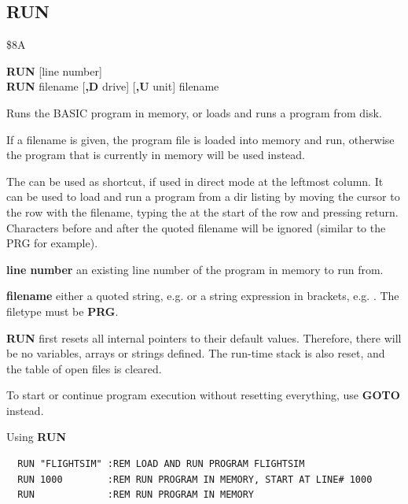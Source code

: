 
\newpage
\subsection{RUN}
\begin{description}[leftmargin=2cm,style=nextline]
\item [Token:] \$8A
\item [Format:] {\bf RUN} [line number] \\
                {\bf RUN} filename [{\bf,D} drive] [{\bf,U} unit]
                {\bf \screentext{$\uparrow$}} filename
\item [Usage:] Runs the BASIC program in memory, or loads and runs a program from disk.

   If a filename is given, the program file is loaded into
   memory and run, otherwise the program that is currently in memory
   will be used instead.

   The {\bf \screentext{$\uparrow$}} can be used as shortcut, if used
   in direct mode at the leftmost column. It can be used to load and run
   a program from a dir listing by moving the cursor to the
   row with the filename, typing the {\bf \screentext{$\uparrow$}} at the
   start of the row and pressing return. Characters before and after the
   quoted filename will be ignored (similar to the PRG for example).

   {\bf line number} an existing line number of the program in memory to run from.

   {\bf filename} either a quoted string, e.g.  or
   a string expression in brackets, e.g. .
   The filetype must be {\bf PRG}.

   \drivedefinition

   \unitdefinition

   {\bf RUN} first resets all internal pointers to their
   default values. Therefore, there will be no variables, arrays
   or strings defined. The run-time stack is also reset, and the
   table of open files is cleared.

\item [Remarks:]
   To start or continue program execution without
   resetting everything, use {\bf GOTO} instead.

\item [Examples:] Using {\bf RUN}
\begin{tcolorbox}[colback=black,coltext=white]
\verbatimfont{\codefont}
\begin{verbatim}
  RUN "FLIGHTSIM" :REM LOAD AND RUN PROGRAM FLIGHTSIM
  RUN 1000        :REM RUN PROGRAM IN MEMORY, START AT LINE# 1000
  RUN             :REM RUN PROGRAM IN MEMORY
\end{verbatim}
\end{tcolorbox}
\end{description}

